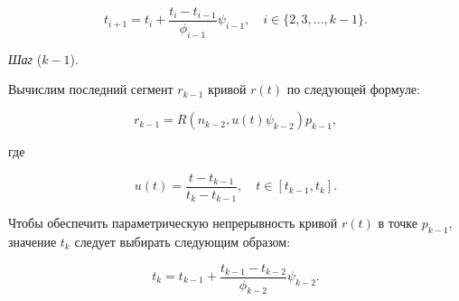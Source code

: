 $$
t_{i+1}=t_i+\frac{t_i-t_{i-1}}{\phi_{i-1}}\psi_{i-1}, \quad i \in \{2,3,\dots,k-1\}.
$$

\bigskip
\textit{Шаг} ($k-1$).

Вычислим последний сегмент $r_{k-1}$ кривой $r(t)$ по следующей формуле:

$$
r_{k-1}=R(n_{k-2},u(t)\psi_{k-2})p_{k-1},
$$

\noindent где

$$
u(t)=\frac{t-t_{k-1}}{t_k-t_{k-1}}, \quad t \in [t_{k-1},t_k].
$$

Чтобы обеспечить параметрическую непрерывность кривой $r(t)$ в точке $p_{k-1}$, значение $t_k$ следует выбирать
следующим образом:

$$
t_k=t_{k-1}+\frac{t_{k-1}-t_{k-2}}{\phi_{k-2}}\psi_{k-2}.
$$

